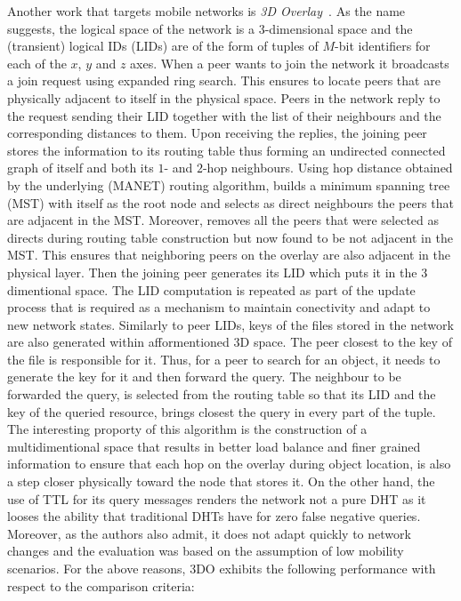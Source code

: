 Another work that targets mobile networks is \emph{3D Overlay}~\cite{AOS2014}. As the
name suggests, the logical space of the network is a 3-dimensional space and
the (transient) logical IDs (LIDs) are of the form of tuples of $M$-bit identifiers
for each of the $x$, $y$ and $z$ axes. 
When a peer wants to join the network it broadcasts a join request using
expanded ring search. This ensures to locate peers that are physically adjacent
to itself in the physical space. Peers in the network reply to the request
sending their LID together with the list of their neighbours and the
corresponding distances to them. Upon receiving the replies, the joining peer
stores the information to its routing table thus forming an undirected connected
graph of itself and both its $1$- and $2$-hop neighbours. Using hop distance
obtained by the underlying (MANET) routing algorithm, builds a
minimum spanning tree (MST) with itself as the root node and selects as direct
neighbours the peers that are adjacent in the MST. Moreover, removes all the
peers that were selected as directs during routing table construction but now
found to be not adjacent in the MST. This ensures that neighboring peers on the
overlay are also adjacent in the physical layer. Then the joining peer generates
its LID which puts it in the 3 dimentional space. The LID computation is repeated
as part of the update process that is required as a mechanism to maintain
conectivity and adapt to new network states. Similarly to peer LIDs,
keys of the files stored in the network are also generated within afformentioned
3D space. The peer closest to the key of the file is responsible for it. Thus,
for a peer to search for an object, it needs to generate the key for it and then
forward the query. The neighbour to be forwarded the query, is
selected from the routing table so that its LID and the key of the queried
resource, brings closest the query in every part of the tuple.
The interesting proporty of this algorithm is the construction of a multidimentional
space that results in better load balance and finer grained information to ensure
that each hop on the overlay during object location, is also a step closer physically
toward the node that stores it. On the other hand, the use of TTL for its query messages
renders the network not a pure DHT as it looses the ability that traditional
DHTs have for zero false negative queries. Moreover, as the authors also admit, it
does not adapt quickly to network changes and the evaluation was based on the assumption
of low mobility scenarios. For the above reasons, 3DO exhibits the following performance
with respect to the comparison criteria:

